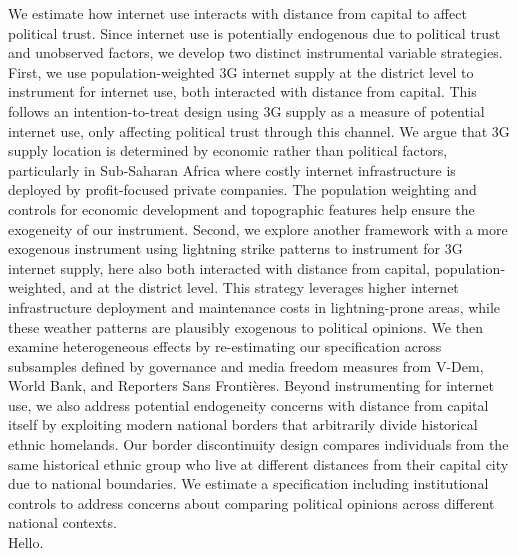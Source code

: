 \documentclass[11pt]{article}
\begin{document}
We estimate how internet use interacts with distance from capital to affect political trust.
Since internet use is potentially endogenous due to political trust and unobserved factors, we develop two distinct instrumental variable strategies.
First, we use population-weighted 3G internet supply at the district level to instrument for internet use, both interacted with distance from capital.
This follows an intention-to-treat design using 3G supply as a measure of potential internet use, only affecting political trust through this channel.
We argue that 3G supply location is determined by economic rather than political factors, particularly in Sub-Saharan Africa where costly internet infrastructure is deployed by profit-focused private companies.
The population weighting and controls for economic development and topographic features help ensure the exogeneity of our instrument.
Second, we explore another framework with a more exogenous instrument using lightning strike patterns to instrument for 3G internet supply, here also both interacted with distance from capital, population-weighted, and at the district level.
This strategy leverages higher internet infrastructure deployment and maintenance costs in lightning-prone areas, while these weather patterns are plausibly exogenous to political opinions.
We then examine heterogeneous effects by re-estimating our specification across subsamples defined by governance and media freedom measures from V-Dem, World Bank, and Reporters Sans Frontières.
Beyond instrumenting for internet use, we also address potential endogeneity concerns with distance from capital itself by exploiting modern national borders that arbitrarily divide historical ethnic homelands.
Our border discontinuity design compares individuals from the same historical ethnic group who live at different distances from their capital city due to national boundaries.
We estimate a specification including institutional controls to address concerns about comparing political opinions across different national contexts.\\

Hello.
\end{document}
